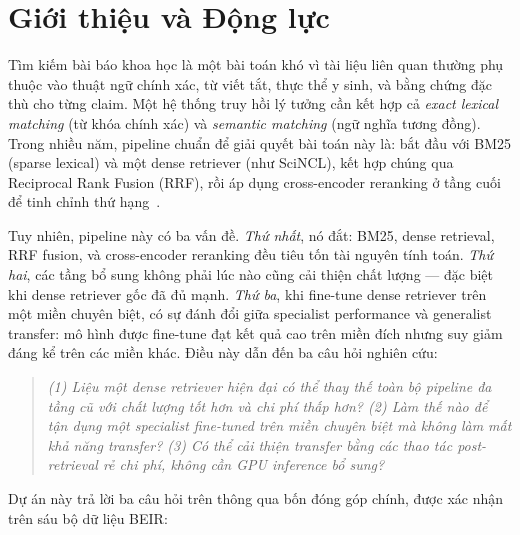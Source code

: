 \section{Giới thiệu và Động lực}
\label{sec:intro}

Tìm kiếm bài báo khoa học là một bài toán khó vì tài liệu liên quan thường phụ thuộc vào thuật ngữ chính
xác, từ viết tắt, thực thể y sinh, và bằng chứng đặc thù cho từng claim. Một hệ thống truy hồi lý tưởng
cần kết hợp cả \emph{exact lexical matching} (từ khóa chính xác) và \emph{semantic matching} (ngữ nghĩa
tương đồng). Trong nhiều năm, pipeline chuẩn để giải quyết bài toán này là: bắt đầu với BM25 (sparse
lexical) và một dense retriever (như SciNCL), kết hợp chúng qua Reciprocal Rank Fusion (RRF), rồi áp dụng
cross-encoder reranking ở tầng cuối để tinh chỉnh thứ hạng~\citep{thakur2021beir,cormack2009rrf}.

Tuy nhiên, pipeline này có ba vấn đề. \emph{Thứ nhất}, nó đắt: BM25, dense retrieval, RRF fusion, và
cross-encoder reranking đều tiêu tốn tài nguyên tính toán. \emph{Thứ hai}, các tầng bổ sung không phải
lúc nào cũng cải thiện chất lượng --- đặc biệt khi dense retriever gốc đã đủ mạnh. \emph{Thứ ba}, khi
fine-tune dense retriever trên một miền chuyên biệt, có sự đánh đổi giữa specialist performance và
generalist transfer: mô hình được fine-tune đạt kết quả cao trên miền đích nhưng suy giảm đáng kể trên
các miền khác. Điều này dẫn đến ba câu hỏi nghiên cứu:

\begin{quote}
\itshape
(1) Liệu một dense retriever hiện đại có thể thay thế toàn bộ pipeline đa tầng cũ với chất lượng tốt hơn
và chi phí thấp hơn? (2) Làm thế nào để tận dụng một specialist fine-tuned trên miền chuyên biệt mà
không làm mất khả năng transfer? (3) Có thể cải thiện transfer bằng các thao tác post-retrieval rẻ chi
phí, không cần GPU inference bổ sung?
\end{quote}

Dự án này trả lời ba câu hỏi trên thông qua bốn đóng góp chính, được xác nhận trên sáu bộ dữ liệu BEIR:

